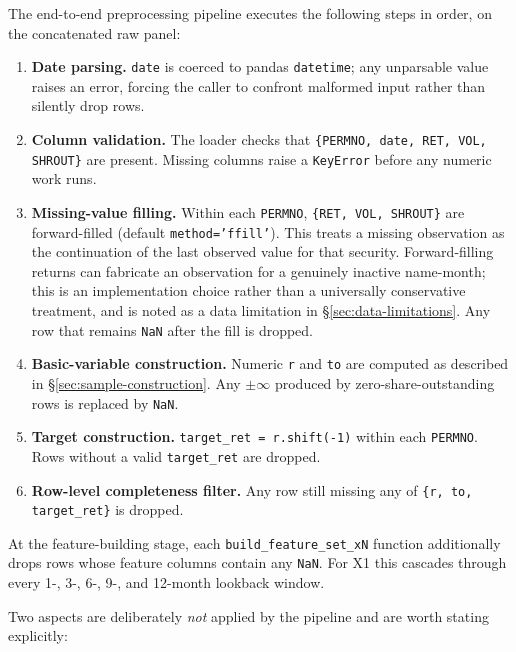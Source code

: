 The end-to-end preprocessing pipeline executes the following steps in order, on the concatenated raw panel:

\begin{enumerate}
 \item \textbf{Date parsing.} \texttt{date} is coerced to pandas \texttt{datetime}; any unparsable value raises an error, forcing the caller to confront malformed input rather than silently drop rows.
 \item \textbf{Column validation.} The loader checks that \texttt{\{PERMNO, date, RET, VOL, SHROUT\}} are present. Missing columns raise a \texttt{KeyError} before any numeric work runs.
 \item \textbf{Missing-value filling.} Within each \texttt{PERMNO}, \texttt{\{RET, VOL, SHROUT\}} are forward-filled (default \texttt{method='ffill'}). This treats a missing observation as the continuation of the last observed value for that security. Forward-filling returns can fabricate an observation for a genuinely inactive name-month; this is an implementation choice rather than a universally conservative treatment, and is noted as a data limitation in \S\ref{sec:data-limitations}. Any row that remains \texttt{NaN} after the fill is dropped.
 \item \textbf{Basic-variable construction.} Numeric \texttt{r} and \texttt{to} are computed as described in \S\ref{sec:sample-construction}. Any $\pm\infty$ produced by zero-share-outstanding rows is replaced by \texttt{NaN}.
 \item \textbf{Target construction.} \texttt{target\_ret = r.shift(-1)} within each \texttt{PERMNO}. Rows without a valid \texttt{target\_ret} are dropped.
 \item \textbf{Row-level completeness filter.} Any row still missing any of \texttt{\{r, to, target\_ret\}} is dropped.
\end{enumerate}

At the feature-building stage, each \texttt{build\_feature\_set\_xN} function additionally drops rows whose feature columns contain any \texttt{NaN}. For X1 this cascades through every 1-, 3-, 6-, 9-, and 12-month lookback window.

Two aspects are deliberately \emph{not} applied by the pipeline and are worth stating explicitly:

